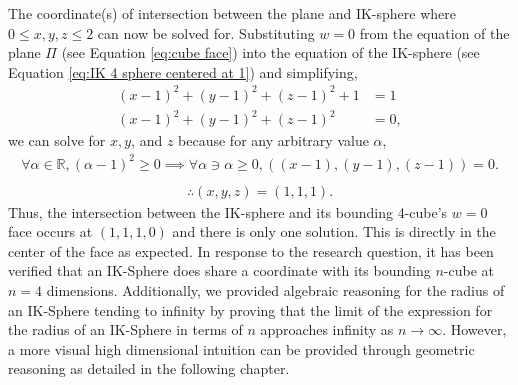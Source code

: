 The coordinate(s) of intersection between the plane and IK-sphere where $0\leq x, y, z \leq 2$ can now be solved for. Substituting $w=0$ from the equation of the plane $\Pi$ (see Equation \ref{eq:cube face}) into the equation of the IK-sphere (see Equation \ref{eq:IK 4 sphere centered at 1}) and simplifying, 
\begin{align*}
    (x-1)^2+(y-1)^2+(z-1)^2+1&=1\\
    (x-1)^2+(y-1)^2+(z-1)^2&=0,
\end{align*}
we can solve for $x, y$, and $z$ because for any arbitrary value $\alpha$,
\begin{align*}
    \forall  \alpha \in \mathbb{R}, (\alpha-1)^2 \geq 0 \implies \forall \alpha \ni \alpha \geq 0, \left( (x-1), (y-1), (z-1)\right) = 0.\\
\end{align*}
\begin{align*}
    \therefore (x, y, z)=(1, 1, 1). 
\end{align*}
Thus, the intersection between the IK-sphere and its bounding 4-cube's $w=0$ face occurs at $(1,1,1,0)$ and there is only one solution. This is directly in the center of the face as expected. In response to the research question, \researchquestion it has been verified that an IK-Sphere does share a coordinate with its bounding $n$-cube at $n=4$ dimensions. Additionally, we provided algebraic reasoning for the radius of an IK-Sphere tending to infinity by proving that the limit of the expression for the radius of an IK-Sphere in terms of $n$ approaches infinity as $n \to \infty$. However, a more visual high dimensional intuition can be provided through geometric reasoning as detailed in the following chapter.

    
